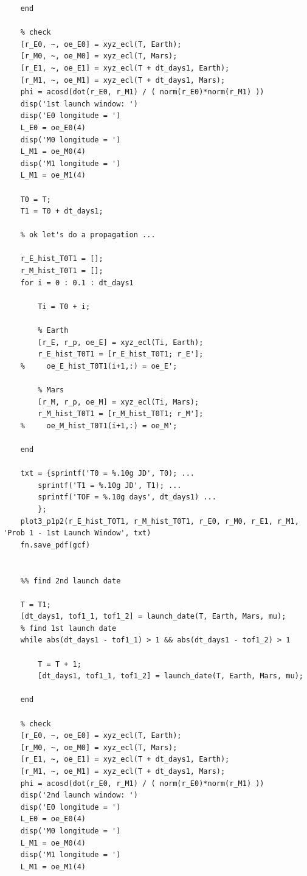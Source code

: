 \documentclass[conf]{new-aiaa}
\begin{document}
\begin{lstlisting}
    end 
    
    % check 
    [r_E0, ~, oe_E0] = xyz_ecl(T, Earth); 
    [r_M0, ~, oe_M0] = xyz_ecl(T, Mars); 
    [r_E1, ~, oe_E1] = xyz_ecl(T + dt_days1, Earth); 
    [r_M1, ~, oe_M1] = xyz_ecl(T + dt_days1, Mars); 
    phi = acosd(dot(r_E0, r_M1) / ( norm(r_E0)*norm(r_M1) ))
    disp('1st launch window: ')
    disp('E0 longitude = ') 
    L_E0 = oe_E0(4)
    disp('M0 longitude = ') 
    L_M1 = oe_M0(4)
    disp('M1 longitude = ') 
    L_M1 = oe_M1(4)
    
    T0 = T; 
    T1 = T0 + dt_days1; 
    
    % ok let's do a propagation ... 
    
    r_E_hist_T0T1 = []; 
    r_M_hist_T0T1 = []; 
    for i = 0 : 0.1 : dt_days1
        
        Ti = T0 + i; 
        
        % Earth 
        [r_E, r_p, oe_E] = xyz_ecl(Ti, Earth); 
        r_E_hist_T0T1 = [r_E_hist_T0T1; r_E']; 
    %     oe_E_hist_T0T1(i+1,:) = oe_E'; 
        
        % Mars 
        [r_M, r_p, oe_M] = xyz_ecl(Ti, Mars); 
        r_M_hist_T0T1 = [r_M_hist_T0T1; r_M']; 
    %     oe_M_hist_T0T1(i+1,:) = oe_M'; 
        
    end 
    
    txt = {sprintf('T0 = %.10g JD', T0); ... 
        sprintf('T1 = %.10g JD', T1); ... 
        sprintf('TOF = %.10g days', dt_days1) ... 
        }; 
    plot3_p1p2(r_E_hist_T0T1, r_M_hist_T0T1, r_E0, r_M0, r_E1, r_M1, 'Prob 1 - 1st Launch Window', txt)
    fn.save_pdf(gcf)
    
    
    %% find 2nd launch date 
    
    T = T1;
    [dt_days1, tof1_1, tof1_2] = launch_date(T, Earth, Mars, mu); 
    % find 1st launch date 
    while abs(dt_days1 - tof1_1) > 1 && abs(dt_days1 - tof1_2) > 1
    
        T = T + 1; 
        [dt_days1, tof1_1, tof1_2] = launch_date(T, Earth, Mars, mu); 
        
    end 
    
    % check 
    [r_E0, ~, oe_E0] = xyz_ecl(T, Earth); 
    [r_M0, ~, oe_M0] = xyz_ecl(T, Mars); 
    [r_E1, ~, oe_E1] = xyz_ecl(T + dt_days1, Earth); 
    [r_M1, ~, oe_M1] = xyz_ecl(T + dt_days1, Mars); 
    phi = acosd(dot(r_E0, r_M1) / ( norm(r_E0)*norm(r_M1) ))
    disp('2nd launch window: ')
    disp('E0 longitude = ') 
    L_E0 = oe_E0(4)
    disp('M0 longitude = ') 
    L_M1 = oe_M0(4)
    disp('M1 longitude = ') 
    L_M1 = oe_M1(4)
    

\end{lstlisting}
\end{document}
